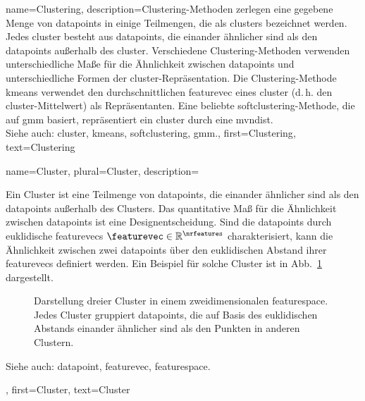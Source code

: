 {{{{
{name={Clustering}, 
	description={Clustering-Methoden zerlegen eine gegebene Menge von 
	\glspl{datapoint} in einige Teilmengen, die als \glspl{cluster} bezeichnet werden. 
	Jedes \gls{cluster} besteht aus \glspl{datapoint}, die einander ähnlicher sind 
	als den \glspl{datapoint} außerhalb des \gls{cluster}. 
	Verschiedene Clustering-Methoden verwenden unterschiedliche Maße für die Ähnlichkeit 
	zwischen \glspl{datapoint} und unterschiedliche Formen der \gls{cluster}-Repräsentation. 
	Die Clustering-Methode \gls{kmeans} verwendet den durchschnittlichen \gls{featurevec} 
	eines \gls{cluster} (d.\,h. den \gls{cluster}-Mittelwert) als Repräsentanten. 
	Eine beliebte \gls{softclustering}-Methode, die auf \gls{gmm} basiert, repräsentiert 
	ein \gls{cluster} durch eine \gls{mvndist}.\\
	Siehe auch: \gls{cluster}, \gls{kmeans}, \gls{softclustering}, \gls{gmm}.},
	first={Clustering},
	text={Clustering} 
}

{name={Cluster}, plural={Cluster}, 
	description={Ein Cluster ist eine Teilmenge von 
	\glspl{datapoint}, die einander ähnlicher sind als den \glspl{datapoint} 
	außerhalb des Clusters. Das quantitative Maß für die Ähnlichkeit zwischen 
	\glspl{datapoint} ist eine Designentscheidung. 
	Sind die \glspl{datapoint} durch euklidische \glspl{featurevec} 
	$\featurevec \in \mathbb{R}^{\nrfeatures}$ charakterisiert, 
	kann die Ähnlichkeit zwischen zwei \glspl{datapoint} über den euklidischen Abstand 
	ihrer \glspl{featurevec} definiert werden. Ein Beispiel für solche Cluster 
	ist in Abb.~\ref{fig:clusters_dict} dargestellt.\\
	\begin{figure}[H]
	\centering
	\caption{Darstellung dreier Cluster in einem zweidimensionalen \gls{featurespace}. 
	Jedes Cluster gruppiert \glspl{datapoint}, die auf Basis des euklidischen Abstands 
	einander ähnlicher sind als den Punkten in anderen Clustern.}
	\label{fig:clusters_dict}
	\end{figure}
	Siehe auch: \gls{datapoint}, \gls{featurevec}, \gls{featurespace}.},
	first={Cluster},
	text={Cluster} 
}

}}}}
